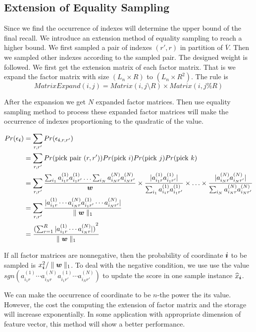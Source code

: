 \documentclass{article}
\newcommand{\Sca}[3]{{#1}^{(#2)}_{i_#2#3}}%
\newcommand{\V}[1]{{\bm{{\MakeLowercase{#1}}}}}%
\newcommand{\norm}[2]{\parallel#1\parallel_{#2}}
\begin{document}
\subsection{Extension of Equality Sampling}

Since we find the occurrence of indexes will determine the upper bound of the final recall. We introduce an extension method of equality sampling to reach a higher bound. We first sampled a pair of indexes $(r',r)$ in partition of $\overline{V}$. Then we sampled other indexes according to the sampled pair. The designed weight is followed. We first get the extension matrix of each factor matrix. That is we expand the factor matrix with size $(L_n \times R)$ to $(L_n \times R^2)$. The rule is
\[
MatrixExpand(i,j) = Matrix(i,j \setminus R)\times Matrix(i,j\%R)
\]

After the expansion we get $N$ expanded factor matrices. Then use equality sampling method to process these expanded factor matrices will make the occurrence of indexes proportioning to the
quadratic of the value.

\begin{align*}
Pr(\epsilon_{\V{i}}) &= \sum_{r,r'} Pr(\epsilon_{\V{i},r,r'})\\
&= \sum_{r,r'} Pr({\rm pick\ pair\ }(r,r'))Pr({\rm pick\ }i)Pr({\rm pick\ }j)Pr({\rm pick\ }k)\\
&= \sum_{r,r'} \frac{\sum_{i_1}{\Sca{a}{1}{r}\Sca{a}{1}{r'}}\ldots\sum_{i_N}{\Sca{a}{N}{r}\Sca{a}{N}{r'}}}{\V{w}}\times
\frac{|\Sca{a}{1}{r}\Sca{a}{1}{r'}|}{\sum_{i_1}{\Sca{a}{1}{r}\Sca{a}{1}{r'}}} \times\ldots\times
\frac{|\Sca{a}{N}{r}\Sca{a}{N}{r'}|}{\sum_{i_N}{\Sca{a}{N}{r}\Sca{a}{N}{r'}}} \\
& = \sum_{r,r'} \frac{|\Sca{a}{1}{r}\cdots\Sca{a}{N}{r}\Sca{a}{1}{r'}\cdots\Sca{a}{N}{r'}|}{\norm{\V{W}}{1}}\\
& = \frac{{(\sum_{r=1}^{R} |\Sca{a}{1}{r}\cdots\Sca{a}{N}{r}|)}^2}{\norm{\V{W}}{1}}
\end{align*}

If all factor matrices are nonnegative, then the probability of coordinate $\V{i}$ to be sampled is $x_{\V{i}}^2/\norm{\V{w}}{1}$.
To deal with the negative condition, we use use the value $sgn(\Sca{a}{1}{r}\cdots\Sca{a}{N}{r}\Sca{a}{1}{r'}\cdots\Sca{a}{N}{r'})$
to update the score in one sample instance $\widehat{x}_{\V{i}}$.

We can make the occurrence of coordinate to be $n$-the power the its value. However, the cost the computing the extension of factor matrix and the storage will increase exponentially. In
some application with appropriate dimension of feature vector, this method will show a better performance.
\end{document}
